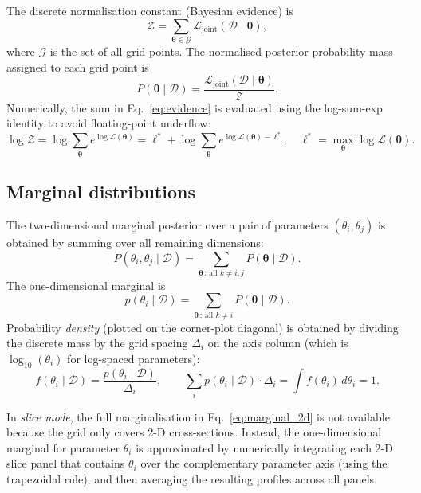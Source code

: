 \documentclass[a4paper,11pt]{article}
\newcommand{\btheta}{\boldsymbol{\theta}}
\newcommand{\logten}{\log_{10}}
\begin{document}
The discrete normalisation constant (Bayesian evidence) is
\begin{equation}
  \mathcal{Z} = \sum_{\btheta \in \mathcal{G}}
                \mathcal{L}_\mathrm{joint}(\mathcal{D}\mid\btheta),
  \label{eq:evidence}
\end{equation}
where $\mathcal{G}$ is the set of all grid points. The normalised posterior
probability mass assigned to each grid point is
\begin{equation}
  P(\btheta\mid\mathcal{D})
  = \frac{\mathcal{L}_\mathrm{joint}(\mathcal{D}\mid\btheta)}{\mathcal{Z}}.
  \label{eq:posterior}
\end{equation}
Numerically, the sum in Eq.~\eqref{eq:evidence} is evaluated using the
log-sum-exp identity to avoid floating-point underflow:
\begin{equation}
  \log\mathcal{Z}
  = \log\sum_\btheta e^{\log\mathcal{L}(\btheta)}
  = \ell^* + \log\sum_\btheta e^{\log\mathcal{L}(\btheta) - \ell^*},
  \quad \ell^* = \max_\btheta\log\mathcal{L}(\btheta).
\end{equation}

\subsection{Marginal distributions}

The two-dimensional marginal posterior over a pair of parameters
$(\theta_i, \theta_j)$ is obtained by summing over all remaining dimensions:
\begin{equation}
  P(\theta_i, \theta_j\mid\mathcal{D})
  = \sum_{\btheta\,:\,\text{all }k\neq i,j}
    P(\btheta\mid\mathcal{D}).
  \label{eq:marginal_2d}
\end{equation}
The one-dimensional marginal is
\begin{equation}
  p(\theta_i\mid\mathcal{D})
  = \sum_{\btheta\,:\,\text{all }k\neq i}
    P(\btheta\mid\mathcal{D}).
  \label{eq:marginal_1d}
\end{equation}
Probability \emph{density} (plotted on the corner-plot diagonal) is obtained
by dividing the discrete mass by the grid spacing $\Delta_i$ on the axis
column (which is $\logten(\theta_i)$ for log-spaced parameters):
\begin{equation}
  f(\theta_i\mid\mathcal{D}) = \frac{p(\theta_i\mid\mathcal{D})}{\Delta_i},
  \qquad
  \sum_i p(\theta_i\mid\mathcal{D})\cdot\Delta_i
  = \int f(\theta_i)\,d\theta_i = 1.
\end{equation}

In \emph{slice mode}, the full marginalisation in Eq.~\eqref{eq:marginal_2d}
is not available because the grid only covers 2-D cross-sections. Instead,
the one-dimensional marginal for parameter $\theta_i$ is approximated by
numerically integrating each 2-D slice panel that contains $\theta_i$ over
the complementary parameter axis (using the trapezoidal rule), and then
averaging the resulting profiles across all panels.
\end{document}
